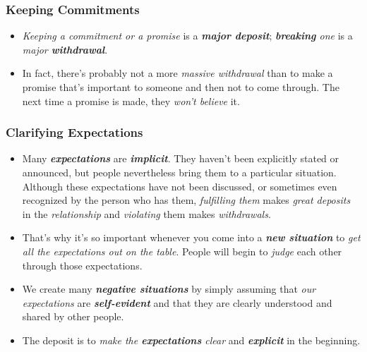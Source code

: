 \documentclass[11pt]{article}
\begin{document}
\subsubsection{Keeping Commitments}
\begin{itemize}
\item \emph{Keeping a commitment or a promise} is a \emph{\textbf{major deposit}}; \emph{\textbf{breaking} one} is a \emph{major \textbf{withdrawal}}. 

\item In fact, there's probably not a more \emph{massive withdrawal} than to make a promise that's important to someone and then not to come through. The next time a promise is made, they \emph{won't believe} it.
\end{itemize}
\subsubsection{Clarifying Expectations}
\begin{itemize}
\item Many \emph{\textbf{expectations}} are \emph{\textbf{implicit}}. They haven't been explicitly stated or announced, but people
nevertheless bring them to a particular situation. Although these expectations have not been discussed, or sometimes even recognized by the person who has them, \emph{fulfilling them} makes \emph{great deposits} in the \emph{relationship} and \emph{violating} them makes \emph{withdrawals}.

\item That's why it's so important whenever you come into a \emph{\textbf{new situation}} to \emph{get all the expectations out on the table}. People will begin to \emph{judge} each other through those expectations. 

\item We create many \emph{\textbf{negative situations}} by simply assuming that \emph{our expectations} are \emph{\textbf{self-evident}} and that they are clearly understood and shared by other people.

\item The deposit is to \emph{make the \textbf{expectations} clear} and \emph{\textbf{explicit}} in the beginning.

\end{itemize}
\end{document}
